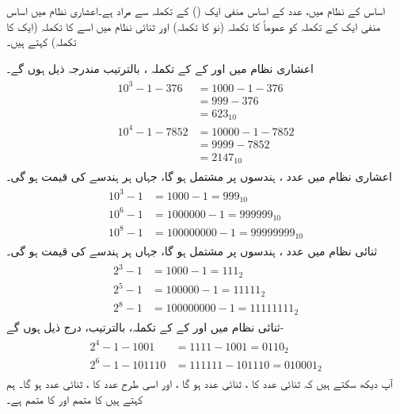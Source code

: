 اساس   کے نظام    میں،    عدد  کے اساس منفی ایک ()  کے تکملہ  سے مراد     ہے۔اعشاری نظام میں اساس منفی ایک کے   تکملہ کو عموماً  کا تکملہ (نو کا تکملہ)       اور ثنائی نظام  میں اسے     کا تکملہ    (ایک کا تکملہ) کہتے ہیں۔
 
اعشاری نظام میں    اور    کے   کے تکملہ ،  بالترتیب   مندرجہ ذیل ہوں گے۔ 
\begin{gather}
\begin{aligned}
10^3-1-376&=1000-1-376\\
&=999-376\\
&=623_{10}\\
10^4-1-7852&=10000-1-7852\\
&=9999-7852\\
&=2147_{10}
\end{aligned}
\end{gather}
اعشاری نظام میں عدد    ،      ہندسوں پر مشتمل ہو گا،  جہاں ہر ہندسے کی قیمت    ہو گی۔
\begin{gather}
\begin{aligned}
10^3-1&=1000-1=999_{10}\\
10^6-1&=1000000-1=999999_{10}\\
10^8-1&=100000000-1=99999999_{10}
\end{aligned}
\end{gather}
ثنائی  نظام میں عدد    ،      ہندسوں پر مشتمل ہو گا،  جہاں ہر ہندسے کی قیمت    ہو گی۔
\begin{gather}
\begin{aligned}
2^3-1&=1000-1=111_{2}\\
2^5-1&=100000-1=11111_{2}\\
2^8-1&=100000000-1=11111111_{2}
\end{aligned}
\end{gather}
 ثنائی نظام میں   اور      کے    کے تکملہ، بالترتیب، درج ذیل ہوں گے- 
\begin{gather}
\begin{aligned}
2^4-1-1001&=1111-1001=0110_2\\
2^6-1-101110&=111111-101110=010001_2
\end{aligned}
\end{gather}
آپ دیکھ سکتے ہیں کہ ثنائی عدد    کا ،   ثنائی عدد    ہو گا  ، اور اسی طرح عدد   کا    ،  ثنائی عدد  ہو گا۔ ہم کہتے ہیں  کا متمم  اور  کا متمم  ہے۔

